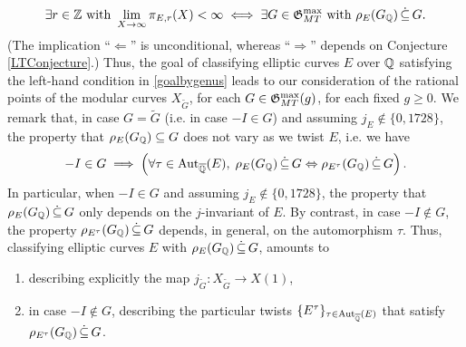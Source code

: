 \begin{equation} \label{goalbygenus}
\exists r \in \mathbb{Z} \text{ with } \lim_{X \rightarrow \infty} \pi_{E,r}(X) < \infty \; \Longleftrightarrow \; \exists G \in \mathfrak{G}_{MT}^{\max} \text{ with } \rho_{E}(G_{\mathbb{Q}}) \, \dot\subseteq \, G.
\end{equation}
(The implication ``$\Longleftarrow$'' is unconditional, whereas ``$\Longrightarrow$'' depends on Conjecture \ref{LTConjecture}.)  Thus, the goal of classifying elliptic curves $E$ over $\mathbb{Q}$ satisfying the left-hand condition in \eqref{goalbygenus} leads to our consideration of the rational points of the modular curves $X_{\tilde{G}}$, for each $G \in \mathfrak{G}_{MT}^{\max}(g)$, for each fixed $g \geq 0$.
We remark that, in case $G = \tilde{G}$ (i.e. in case $-I \in G$) and assuming $j_E \notin \{ 0, 1728 \}$, the property that $\rho_{E}(G_{\mathbb{Q}}) \subseteq G$ does not vary as we twist $E$, i.e. we have
\[
-I \in G \; \Longrightarrow \; \left( \forall \tau \in \operatorname{Aut}_{\overline{\mathbb{Q}}}(E), \; \rho_{E}(G_{\mathbb{Q}}) \, \dot\subseteq \, G \Leftrightarrow \rho_{E^{\tau}}(G_{\mathbb{Q}}) \, \dot\subseteq \, G \right).
\]
In particular, when $-I \in G$ and assuming $j_E \notin \{ 0, 1728 \}$, the property that $\rho_{E}(G_{\mathbb{Q}}) \, \dot\subseteq \, G$ only depends on the $j$-invariant of $E$.  By contrast, in case $-I \notin G$, the property $\rho_{E^{\tau}}(G_{\mathbb{Q}}) \, \dot\subseteq \, G$ depends, in general, on the automorphism $\tau$.  Thus, classifying elliptic curves $E$ with $\rho_{E}(G_{\mathbb{Q}}) \, \dot\subseteq \, G$, amounts to 
\begin{enumerate}
\item describing explicitly the map $j_{\tilde{G}} : X_{\tilde{G}} \longrightarrow X(1)$,
\item in case $-I \notin G$, describing the particular twists $\{ E^{\tau} \}_{\tau \in \operatorname{Aut}_{\overline{\mathbb{Q}}}(E)}$ that satisfy $\rho_{E^{\tau}}(G_{\mathbb{Q}}) \, \dot\subseteq \, G$.
\end{enumerate}

